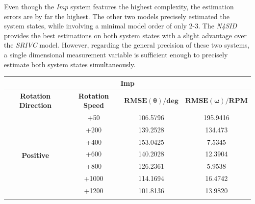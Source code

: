 \documentclass[english]{isasthesis}
\begin{document}
  	Even though the \textit{Imp} system features the highest complexity, the estimation errors are by far the highest. The other two models precisely estimated the system states, while involving a minimal model order of only 2-3. The \textit{N4SID} provides the best estimations on both system states with a slight advantage over the \textit{SRIVC} model. However, regarding the general precision of these two systems, a single dimensional measurement variable is sufficient enough to precisely estimate both system states simultaneously.
  	\begin{table}[]
\begin{tabular}{|c|c|c|c|}
\hline
\multicolumn{4}{|c|}{\textbf{Imp}}                                                                                                                                        \\ \hline\hline
\textbf{Rotation Direction}        & \textbf{Rotation Speed}                                                & $\mathbf{RMSE(\theta) / deg}$ & $\mathbf{RMSE(\omega) / RPM}$ \\ \hline
\multirow{9}{*}{\textbf{Positive}} & +50                                                                   &    106.5796                           &        195.9416                       \\ \cline{2-4}
& +200                                                                   &    139.2528 &        134.473                       												\\ \cline{2-4}
  & +400                                                                   &     153.0425 &      7.5345                         \\ \cline{2-4}
                                   & +600                                                                   &         140.2028                      &             12.3904                 \\ \cline{2-4}
                                   & +800                                                                   &       126.2361                        &              5.9538                 \\ \cline{2-4}
                                   & +1000                                                                  &        114.1694                       &             16.4742                  \\ \cline{2-4}
                                   & +1200                                                                  &          101.8136                     &            13.9820                   \\ \cline{2-4}

\end{tabular}
\end{table}
\end{document}
